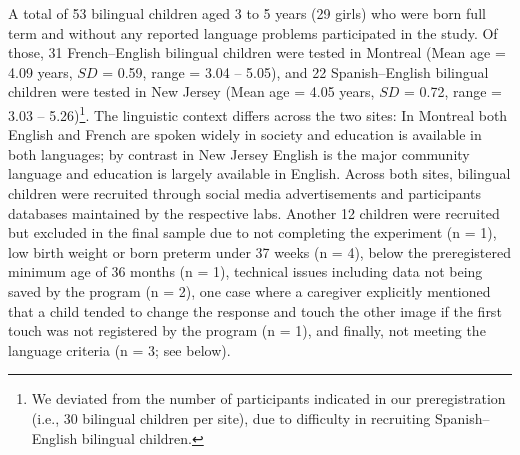 \documentclass[
  man,floatsintext]{apa7}
\begin{document}
A total of 53 bilingual children aged 3 to 5 years (29 girls) who were born full term and without any reported language problems participated in the study. Of those, 31 French--English bilingual children were tested in Montreal (Mean age = 4.09 years, \(SD\) = 0.59, range = 3.04 -- 5.05), and 22 Spanish--English bilingual children were tested in New Jersey (Mean age = 4.05 years, \(SD\) = 0.72, range = 3.03 -- 5.26)\footnote{We deviated from the number of participants indicated in our preregistration (i.e., 30 bilingual children per site), due to difficulty in recruiting Spanish--English bilingual children.}. The linguistic context differs across the two sites: In Montreal both English and French are spoken widely in society and education is available in both languages; by contrast in New Jersey English is the major community language and education is largely available in English. Across both sites, bilingual children were recruited through social media advertisements and participants databases maintained by the respective labs. Another 12 children were recruited but excluded in the final sample due to not completing the experiment (n = 1), low birth weight or born preterm under 37 weeks (n = 4), below the preregistered minimum age of 36 months (n = 1), technical issues including data not being saved by the program (n = 2), one case where a caregiver explicitly mentioned that a child tended to change the response and touch the other image if the first touch was not registered by the program (n = 1), and finally, not meeting the language criteria (n = 3; see below).
\end{document}
